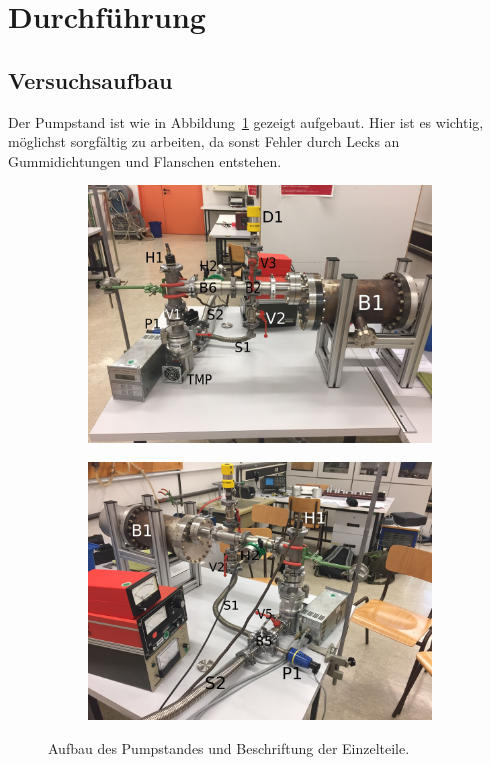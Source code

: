 \section{Durchführung}
\label{sec:Durchführung}

\subsection{Versuchsaufbau}
Der Pumpstand ist wie in Abbildung~\ref{fig:Aufbau} gezeigt aufgebaut.
Hier ist es wichtig, möglichst sorgfältig zu arbeiten,
da sonst Fehler durch Lecks an Gummidichtungen und Flanschen entstehen.
\begin{figure}
  \begin{subfigure}[c]{0.5\textwidth}
    \includegraphics[width=\textwidth]{IMG_6888.JPG}
  \end{subfigure}
  \begin{subfigure}[c]{0.5\textwidth}
    \includegraphics[width=\textwidth]{IMG_6889.JPG}
  \end{subfigure}
  \caption{Aufbau des Pumpstandes und Beschriftung der Einzelteile.}
  \label{fig:Aufbau}
\end{figure}

